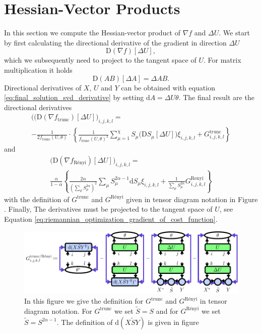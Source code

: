 \section{Hessian-Vector Products}
\label{sec:renyi_trunc_hvps}
%
%
In this section we compute the Hessian-vector product of $\nabla f$ and $\Delta U$. We start by first calculating the directional derivative of the gradient in direction $\Delta U$
\begin{equation}
	\text{D}\left(\nabla f\right)\left[\Delta U\right],
\end{equation}
which we subsequently need to project to the tangent space of $U$. For matrix multiplication it holds\cite{cite:the_matrix_cook_book}
\begin{equation}
	\text{D}\left(AB\right)\left[\Delta A\right] = \Delta AB.
\end{equation}
Directional derivatives of $X$, $U$ and $Y$ can be obtained with equation \eqref{eq:final_solution_svd_derivative} by setting $\text{d}A = \Delta U\theta$. The final result are the directional derivatives
\begin{multline}
	\big((\text{D}(\nabla f_\text{trunc})[\Delta U]\big)_{i,j,k,l} = \\
	-\frac{1}{2f_\text{trunc}(U, \theta)} \cdot \left\{\frac{1}{f_\text{trunc}(U,\theta)^2}\sum_{\mu=1}^{\chi}S_\mu\big(\text{D}S_\mu[\Delta U]\big)\xi_{i,j,k,l} + G^\text{trunc}_{i,j,k,l}\right\}
\end{multline}
and
\begin{multline}	
	\big(\text{D}(\nabla f_\text{Rényi})[\Delta U]\big)_{i,j,k,l} = \\
	\frac{\alpha}{1-\alpha} \left\{\frac{2\alpha}{\left(\sum_\mu S_\mu^{2\alpha}\right)^2}\sum_\mu S_\mu^{2\alpha-1}\text{d}S_\mu\xi_{i,j,k,l} + \frac{1}{\sum_\mu S_\mu^{2\alpha}}G^\text{Renyi}_{i,j,k,l}\right\}
\end{multline}
with the definition of $G^\text{trunc}$ and $G^\text{Rényi}$ given in tensor diagram notation in Figure . Finally, The derivatives must be projected to the tangent space of $U$, see Equation \eqref{eq:riemannian_optimization_gradient_of_cost_function}.
\begin{figure}
	\centering
	\includegraphics[scale=0.9]{figures/tikz/gradient_and_hvp/G_definition/G_definition.pdf}
	\caption{In this figure we give the definition for $G^\text{trunc}$ and $G^\text{Rényi}$ in tensor diagram notation. For $G^\text{trunc}$ we set  $\tilde{S} = S$ and for $G^\text{Rényi}$ we set  $\tilde{S} = S^{2\alpha-1}$. The definition of $\text{d}(X\tilde{S}Y)$ is given in figure \protect{}}
	\label{fig:G_definition}
\end{figure}
